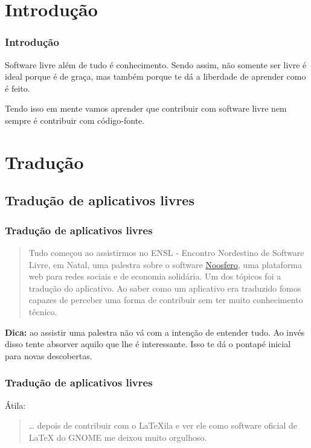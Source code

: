 \section{Introdução}

\begin{frame}\frametitle{Introdução}

Software livre além de tudo é conhecimento. Sendo assim, não somente ser
livre é ideal porque é de graça, mas também porque te dá a liberdade de
aprender como é feito.

Tendo isso em mente vamos aprender que contribuir com software livre nem
sempre é contribuir com código-fonte.

\end{frame}

\begin{frame}\frametitle{}


\end{frame}

\section{Tradução}

\subsection{Tradução de aplicativos livres}

\begin{frame}\frametitle{Tradução de aplicativos livres}

\begin{quote}
Tudo começou ao assistirmos no ENSL - Encontro Nordestino de Software
Livre, em Natal, uma palestra sobre o software
\href{http://noosfero.org/}{Noosfero}, uma plataforma web para redes
sociais e de economia solidária. Um dos tópicos foi a tradução do
aplicativo. Ao saber como um aplicativo era traduzido fomos capazes de
perceber uma forma de contribuir sem ter muito conhecimento técnico.

\end{quote}
\textbf{Dica:} ao assistir uma palestra não vá com a intenção de
entender tudo. Ao invés disso tente absorver aquilo que lhe é
interessante. Isso te dá o pontapé inicial para novas descobertas.

\end{frame}

\begin{frame}\frametitle{Tradução de aplicativos livres}

Átila:

\begin{quote}
\ldots{} depois de contribuir com o LaTeXila e ver ele como software
oficial de LaTeX do GNOME me deixou muito orgulhoso.

\end{quote}
\end{frame}

